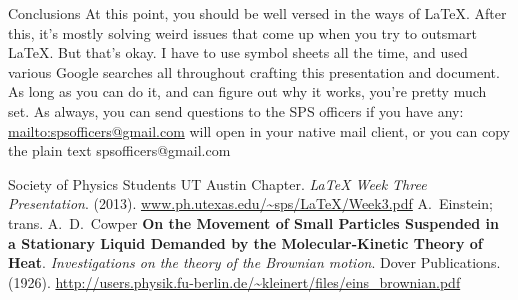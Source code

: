 \documentclass[onecolumn]{article}
\begin{document}
\begin{section}{Conclusions}
	At this point, you should be well versed in the ways of \LaTeX. After this, it's mostly solving weird issues that come up when you try to outsmart \LaTeX. But that's okay. I have to
	use symbol sheets all the time, and used various Google searches all throughout crafting this presentation and document. As long as you can do it, and can figure out why it works,
	you're pretty much set. As always, you can send questions to the SPS officers if you have any: \url{mailto:spsofficers@gmail.com} will open in your native mail client, or you can copy
	the plain text spsofficers@gmail.com
\end{section}
\begin{thebibliography}{9}
Society of Physics Students UT Austin Chapter. \emph{LaTeX Week Three Presentation}. (2013). \url{www.ph.utexas.edu/~sps/LaTeX/Week3.pdf}
A.~Einstein; trans. A.~D.~Cowper \textbf{On the Movement of Small Particles Suspended in a Stationary Liquid Demanded by the Molecular-Kinetic Theory of Heat}.
	\emph{Investigations on the theory of the Brownian motion}. Dover Publications. (1926). \url{http://users.physik.fu-berlin.de/~kleinert/files/eins_brownian.pdf}
\end{thebibliography}
\end{document}
